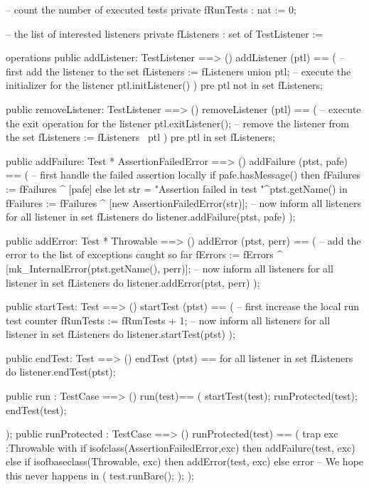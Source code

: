 \documentclass[a4paper]{article}
\begin{document}
\begin{vdm_al}
  -- count the number of executed tests
  private fRunTests : nat := 0;
  
  -- the list of interested listeners
  private fListeners : set of TestListener := {}
  
operations
  public addListener: TestListener ==> ()
  addListener (ptl) == 
    ( -- first add the listener to the set
      fListeners := fListeners union {ptl};
      -- execute the initializer for the listener
      ptl.initListener() )
    pre ptl not in set fListeners;
  
  public removeListener: TestListener ==> ()
  removeListener (ptl) ==
    ( -- execute the exit operation for the listener
      ptl.exitListener();
      -- remove the listener from the set
      fListeners := fListeners \ {ptl} )
    pre ptl in set fListeners;
  
  public addFailure: Test * AssertionFailedError ==> ()
  addFailure (ptst, pafe) == 
    ( -- first handle the failed assertion locally
      if pafe.hasMessage()
      then fFailures := fFailures ^ [pafe]
      else let str = "Assertion failed in test "^ptst.getName() in
             fFailures := fFailures ^ [new AssertionFailedError(str)];
      -- now inform all listeners
      for all listener in set fListeners do
        listener.addFailure(ptst, pafe) );
  
  public addError: Test * Throwable ==> ()
  addError (ptst, perr) ==
    ( -- add the error to the list of exceptions caught so far
      fErrors := fErrors ^ [mk_InternalError(ptst.getName(), perr)];
      -- now inform all listeners
      for all listener in set fListeners do
        listener.addError(ptst, perr) );

  public startTest: Test ==> ()
  startTest (ptst) ==
    ( -- first increase the local run test counter
      fRunTests := fRunTests + 1;
      -- now inform all listeners
      for all listener in set fListeners do
        listener.startTest(ptst) );
  
  public endTest: Test ==> ()
  endTest (ptst) ==
    for all listener in set fListeners do
      listener.endTest(ptst);

  public run : TestCase ==> ()
  run(test)==
  ( 
    startTest(test);
    runProtected(test);
    endTest(test);

  );
  public runProtected : TestCase ==> () 
  runProtected(test) ==
  (
    trap exc :Throwable
        with
          if isofclass(AssertionFailedError,exc)
          then addFailure(test, exc)
          else if isofbaseclass(Throwable, exc)
               then addError(test, exc)
               else error -- We hope this never happens
        in (
              test.runBare();
            ); 
  );
  

\end{vdm_al}
\end{document}
